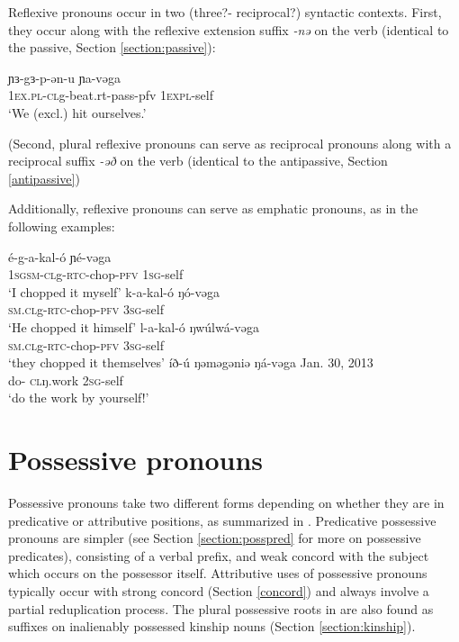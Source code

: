 Reflexive pronouns occur in two (three?- reciprocal?) syntactic contexts. First, they occur along with the reflexive extension suffix  \textit{-nə} on the verb (identical to the passive, Section \ref{section:passive}):

\ea 	\gll ɲɜ-gɜ-p-ən-u ɲa-vəga \\
			1\textsc{ex}.\textsc{pl}-\textsc{cl}g-beat.rt-pass-pfv 1\textsc{expl}-self\\
		\glt	`We (excl.) hit ourselves.'
\z %

(Second, plural reflexive pronouns can serve as reciprocal pronouns along with a reciprocal suffix \textit{-əð} on the verb (identical to the antipassive, Section \ref{antipassive})



Additionally, reflexive pronouns can serve as emphatic pronouns, as in the following examples:

\ea \ea \gll é-g-a-kal-ó 			ɲé-vəga	\\
		1\textsc{sg}\textsc{sm}-\textsc{cl}g-\textsc{rtc}-chop-\textsc{pfv}	1\textsc{sg}-self  \\
		\glt ‘I chopped it myself’
	\ex \gll k-a-kal-ó 			ŋó-vəga				\\
		\textsc{sm.cl}g-\textsc{rtc}-chop-\textsc{pfv}		3\textsc{sg}-self \\
		\glt ‘He chopped it himself’
	\ex \gll l-a-kal-ó 			ŋwúlwá-vəga	\\
			\textsc{sm.cl}g-\textsc{rtc}-chop-\textsc{pfv}		3\textsc{sg}-self \\
		\glt ‘they chopped it themselves’
	\ex	\gll íð-ú 	ŋəməgəniə 	ŋá-vəga		{Jan. 30, 2013}\\
				do- \textsc{cl}ŋ.work 	2\textsc{sg}-self {} \\
		\glt ‘do the work by yourself!’
	\z
\z 


\section{Possessive pronouns}\label{section:posspro} %

Possessive pronouns take two different forms depending on whether they are in predicative or attributive positions, as summarized in . Predicative possessive pronouns are simpler (see Section \ref{section:posspred} for more on possessive predicates), consisting of a verbal prefix, and weak concord with the subject which occurs on the possessor itself.  Attributive uses of possessive pronouns typically occur with strong concord (Section \ref{concord}) and always involve a partial reduplication process. The plural possessive roots in  are also found as suffixes on inalienably possessed kinship nouns (Section \ref{section:kinship}).


